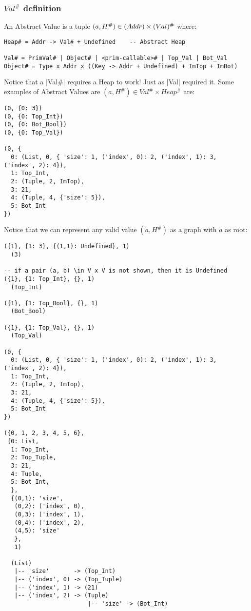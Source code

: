 \subsubsection*{\(Val^\#\) definition}

An Abstract Value is a tuple
\((a, H^\#) \in \text(Addr) \times \text(Val)^\#\) where:

\begin{verbatim}
Heap# = Addr -> Val# + Undefined    -- Abstract Heap

Val# = PrimVal# | Object# | <prim-callable># | Top_Val | Bot_Val
Object# = Type x Addr x ((Key -> Addr + Undefined) + ImTop + ImBot)
\end{verbatim}

Notice that a \pycode|Val#| requires a Heap to work! Just as
\pycode|Val| required it. Some examples of Abstract Values are
\((a, H^\#) \in Val^\# \times Heap^\#\) are:

\begin{verbatim}
(0, {0: 3})
(0, {0: Top_Int})
(0, {0: Bot_Bool})
(0, {0: Top_Val})

(0, {
  0: (List, 0, { 'size': 1, ('index', 0): 2, ('index', 1): 3, ('index', 2): 4}),
  1: Top_Int,
  2: (Tuple, 2, ImTop),
  3: 21,
  4: (Tuple, 4, {'size': 5}),
  5: Bot_Int
})
\end{verbatim}

Notice that we can represent any valid value \((a, H^\#)\) as a graph
with \(a\) as root:


\begin{verbatim}
({1}, {1: 3}, {(1,1): Undefined}, 1)
  (3)

-- if a pair (a, b) \in V x V is not shown, then it is Undefined
({1}, {1: Top_Int}, {}, 1)
  (Top_Int)

({1}, {1: Top_Bool}, {}, 1)
  (Bot_Bool)

({1}, {1: Top_Val}, {}, 1)
  (Top_Val)

(0, {
  0: (List, 0, { 'size': 1, ('index', 0): 2, ('index', 1): 3, ('index', 2): 4}),
  1: Top_Int,
  2: (Tuple, 2, ImTop),
  3: 21,
  4: (Tuple, 4, {'size': 5}),
  5: Bot_Int
})

({0, 1, 2, 3, 4, 5, 6},
 {0: List,
  1: Top_Int,
  2: Top_Tuple,
  3: 21,
  4: Tuple,
  5: Bot_Int,
  },
  {(0,1): 'size',
   (0,2): ('index', 0),
   (0,3): ('index', 1),
   (0,4): ('index', 2),
   (4,5): 'size'
   },
   1)

  (List)
   |-- 'size'       -> (Top_Int)
   |-- ('index', 0) -> (Top_Tuple)
   |-- ('index', 1) -> (21)
   |-- ('index', 2) -> (Tuple)
                        |-- 'size' -> (Bot_Int)
\end{verbatim}

